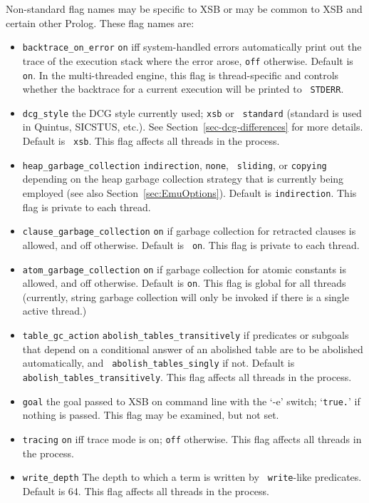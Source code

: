 \begin{description}
Non-standard flag names may be specific to XSB or may be common to XSB
and certain other Prolog.  These flag names are:
\begin{itemize}
%
\item {\tt backtrace\_on\_error} {\tt on} iff system-handled errors
automatically print out the trace of the execution stack where the
error arose, {\tt off} otherwise. Default is {\tt on}.  In the
multi-threaded engine, this flag is thread-specific and controls
whether the backtrace for a current execution will be printed to {\tt
  STDERR}.
%
\item {\tt dcg\_style}  the DCG style currently used; {\tt xsb} or {\tt
  standard} (standard is used in Quintus, SICSTUS, etc.).  See
Section~\ref{sec-dcg-differences} for more details. Default is {\tt
  xsb}. This flag affects all threads in the process.
%
%
\item {\tt heap\_garbage\_collection}  {\tt indirection}, {\tt none}, {\tt
  sliding}, or {\tt copying} depending on the heap garbage collection
strategy that is currently being employed (see also
Section~\ref{sec:EmuOptions}).  Default is {\tt indirection}.  This
flag is private to each thread.  
%
\item {\tt clause\_garbage\_collection}  {\tt on} if garbage collection for
retracted clauses is allowed, and off otherwise. Default is {\tt
  on}.  This flag is private to each thread.  
%
\item {\tt atom\_garbage\_collection}  {\tt on} if garbage collection for
atomic constants is allowed, and off otherwise. Default is {\tt on}.
This flag is global for all threads (currently, string garbage
collection will only be invoked if there is a single active thread.)

%
\item {\tt table\_gc\_action}  {\tt abolish\_tables\_transitively} if
  predicates or subgoals that depend on a conditional answer of an
  abolished table are to be abolished automatically, and {\tt
    abolish\_tables\_singly} if not.  Default is {\tt
    abolish\_tables\_transitively}.  This flag affects all threads in
  the process. 
%
\item {\tt goal}  the goal passed to XSB on command line with the `-e'
switch; `{\tt true.}' if nothing is passed.  This flag may be
examined, but not set. 
%
\item {\tt tracing}  {\tt on} iff trace mode is on; {\tt off}
otherwise. This flag affects all threads in the process. 
%
\item {\tt write\_depth}  The depth to which a term is written by {\tt
  write}-like predicates.  Default is 64.  This flag affects all
threads in the process.  


\end{itemize}
\end{description}
